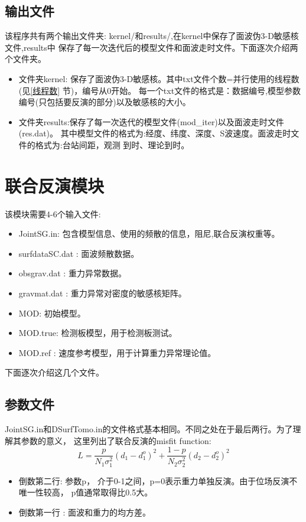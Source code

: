 \documentclass[10p,UTF8]{ctexart}
\begin{document}
   \subsection{输出文件}\label{面波输出文件}
   该程序共有两个输出文件夹: kernel/和results/,在kernel中保存了面波伪3-D敏感核文件,results中
   保存了每一次迭代后的模型文件和面波走时文件。下面逐次介绍两个文件夹。
   \begin{itemize}
    \item 文件夹kernel: 保存了面波伪3-D敏感核。其中txt文件个数=并行使用的线程数(见\ref{线程数} 节)，编号从0开始。
           每一个txt文件的格式是：数据编号,模型参数编号(只包括要反演的部分)以及敏感核的大小。
    \item 文件夹results:保存了每一次迭代的模型文件(mod\_iter\*)以及面波走时文件(res\*.dat)。
            其中模型文件的格式为:经度、纬度、深度、S波速度。面波走时文件的格式为:台站间距，观测
            到时、理论到时。
    \end{itemize}

   \section{联合反演模块}
   该模块需要4-6个输入文件:
    \begin{itemize}
        \item JointSG.in: 包含模型信息、使用的频散的信息，阻尼,联合反演权重等。
        \item surfdataSC.dat : 面波频散数据。
        \item obsgrav.dat : 重力异常数据。
        \item gravmat.dat : 重力异常对密度的敏感核矩阵。
        \item MOD: 初始模型。
        \item MOD.true: 检测板模型，用于检测板测试。
        \item MOD.ref : 速度参考模型，用于计算重力异常理论值。
    \end{itemize}
    下面逐次介绍这几个文件。

    \subsection{参数文件}
    JointSG.in和DSurfTomo.in的文件格式基本相同。不同之处在于最后两行。为了理解其参数的意义，
    这里列出了联合反演的misfit function:
    \[
        L = \frac{p}{N_1 \sigma_1^2} (d_1- d_1^o)^2 + 
            \frac{1-p}{N_2 \sigma_2^2} (d_2- d_2^o)^2 \tag{1}
    \]
    \begin{itemize}
        \item 倒数第二行: 参数p， 介于0-1之间，p=0表示重力单独反演。由于位场反演不唯一性较高，
                        p值通常取得比0.5大。
        \item 倒数第一行 : 面波和重力的均方差。
    \end{itemize}
\end{document}
